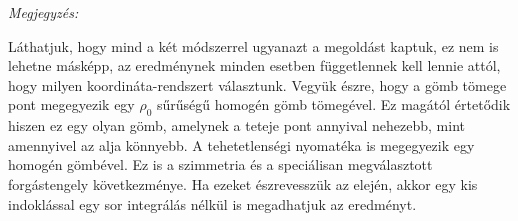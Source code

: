  \emph{Megjegyzés:}
 
 Láthatjuk, hogy mind a két módszerrel ugyanazt a megoldást kaptuk, ez nem is lehetne másképp, az eredménynek minden esetben függetlennek kell lennie attól, hogy milyen koordináta-rendszert választunk. Vegyük észre, hogy a gömb tömege pont megegyezik egy $\rho_0$ sűrűségű homogén gömb tömegével. Ez magától értetődik hiszen ez egy olyan gömb, amelynek a teteje pont annyival nehezebb, mint amennyivel az alja könnyebb. A tehetetlenségi nyomatéka is megegyezik egy homogén gömbével. Ez is a szimmetria és a speciálisan megválasztott forgástengely következménye. Ha ezeket észrevesszük az elején, akkor egy kis indoklással egy sor integrálás nélkül is megadhatjuk az eredményt. 

\fi